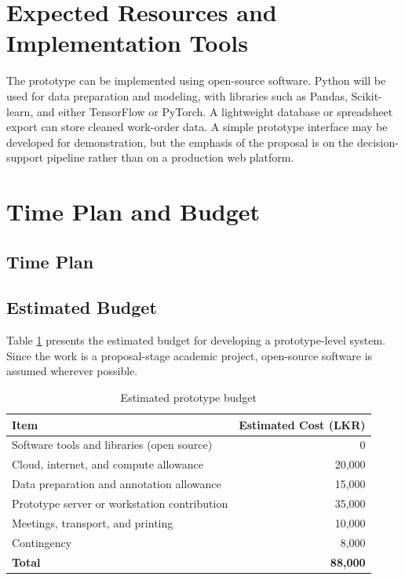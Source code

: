 \documentclass[11pt,a4paper]{report}
\begin{document}
\section{Expected Resources and Implementation Tools}
The prototype can be implemented using open-source software. Python will be used for data preparation and modeling, with libraries such as Pandas, Scikit-learn, and either TensorFlow or PyTorch. A lightweight database or spreadsheet export can store cleaned work-order data. A simple prototype interface may be developed for demonstration, but the emphasis of the proposal is on the decision-support pipeline rather than on a production web platform.

\section{Time Plan and Budget}
\subsection{Time Plan}


\subsection{Estimated Budget}
Table \ref{tab:budget} presents the estimated budget for developing a prototype-level system. Since the work is a proposal-stage academic project, open-source software is assumed wherever possible.

\begin{table}[H]
\centering
\caption{Estimated prototype budget}
\label{tab:budget}
\begin{tabular}{|p{8cm}|r|}
\hline
\textbf{Item} & \textbf{Estimated Cost (LKR)} \\
\hline
Software tools and libraries (open source) & 0 \\
\hline
Cloud, internet, and compute allowance & 20,000 \\
\hline
Data preparation and annotation allowance & 15,000 \\
\hline
Prototype server or workstation contribution & 35,000 \\
\hline
Meetings, transport, and printing & 10,000 \\
\hline
Contingency & 8,000 \\
\hline
\textbf{Total} & \textbf{88,000} \\
\hline
\end{tabular}
\end{table}
\end{document}
